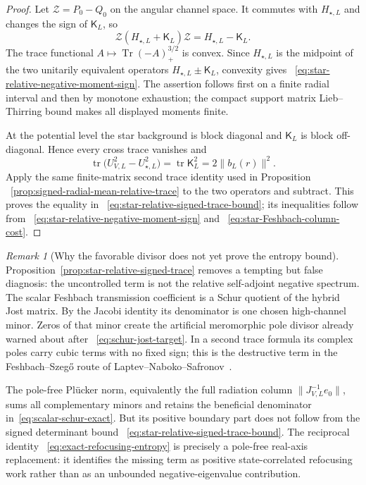 \documentclass[11pt]{article}
\theoremstyle{definition}
\theoremstyle{remark}
\newtheorem{remark}[theorem]{Remark}
\begin{document}
\begin{proof}
Let $\mathcal Z=P_0-Q_0$ on the angular channel space.  It commutes with
$H_{\star,L}$ and changes the sign of $\mathsf K_L$, so
\begin{equation}
 \mathcal Z(H_{\star,L}+\mathsf K_L)\mathcal Z
 =H_{\star,L}-\mathsf K_L.
\end{equation}
The trace functional
$A\mapsto\operatorname{Tr}(-A)_+^{3/2}$ is convex.  Since
$H_{\star,L}$ is the midpoint of the two unitarily equivalent operators
$H_{\star,L}\pm\mathsf K_L$, convexity gives
~\eqref{eq:star-relative-negative-moment-sign}.  The assertion follows first
on a finite radial interval and then by monotone exhaustion; the compact
support matrix Lieb--Thirring bound makes all displayed moments finite.

At the potential level the star background is block diagonal and
$\mathsf K_L$ is block off-diagonal.  Hence every cross trace vanishes and
\begin{equation}
 \operatorname{tr}\bigl(U_{V,L}^2-U_{\star,L}^2\bigr)
 =\operatorname{tr}\mathsf K_L^2=2\|b_L(r)\|^2.
\end{equation}
Apply the same finite-matrix second trace identity used in Proposition
~\ref{prop:signed-radial-mean-relative-trace} to the two operators and
subtract.  This proves the equality in
~\eqref{eq:star-relative-signed-trace-bound}; its inequalities follow from
~\eqref{eq:star-relative-negative-moment-sign} and
~\eqref{eq:star-Feshbach-column-cost}.
\end{proof}

\begin{remark}[Why the favorable divisor does not yet prove the entropy bound]
\label{rem:star-trace-versus-schur-divisor}
Proposition~\ref{prop:star-relative-signed-trace} removes a tempting but false
diagnosis: the uncontrolled term is not the relative self-adjoint negative
spectrum.  The scalar Feshbach transmission coefficient is a Schur quotient
of the hybrid Jost matrix.  By the Jacobi identity its denominator is one
chosen high-channel minor.  Zeros of that minor create the artificial
meromorphic pole divisor already warned about after
~\eqref{eq:schur-jost-target}.  In a second trace formula its complex poles
carry cubic terms with no fixed sign; this is the destructive term in the
Feshbach--Szeg\H{o} route of Laptev--Naboko--Safronov~\cite{LNS2005}.

The pole-free Pl\"ucker norm, equivalently the full radiation column
$\|J_{V,L}^{-1}e_0\|$, sums all complementary minors and retains the beneficial
denominator in~\eqref{eq:scalar-schur-exact}.  But its positive boundary part
does not follow from the signed determinant bound
~\eqref{eq:star-relative-signed-trace-bound}.  The reciprocal identity
~\eqref{eq:exact-refocusing-entropy} is precisely a pole-free real-axis
replacement: it identifies the missing term as positive state-correlated
refocusing work rather than as an unbounded negative-eigenvalue contribution.
\end{remark}
\end{document}
